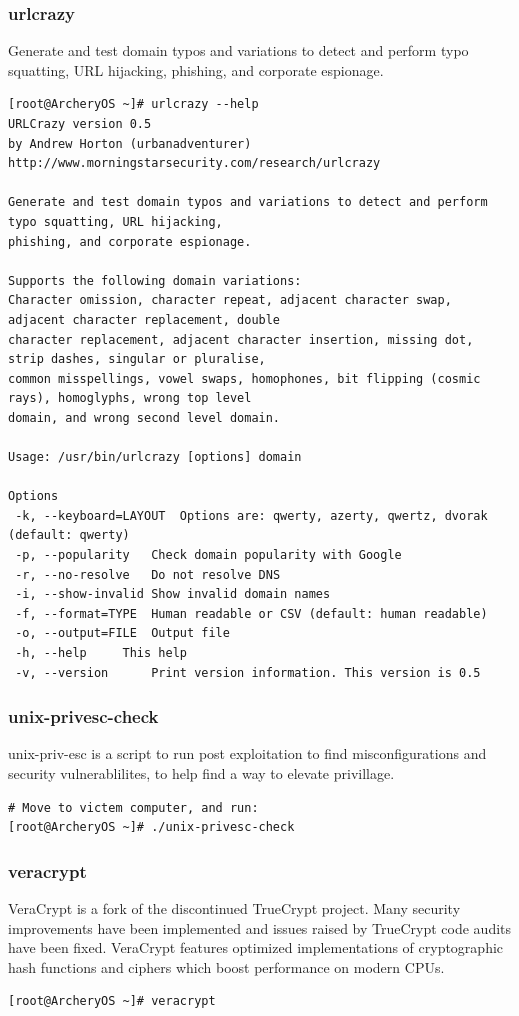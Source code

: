 \documentclass{article}
\begin{document}
\subsubsection{urlcrazy}
Generate and test domain typos and variations to detect and perform typo squatting, URL hijacking, phishing, and corporate espionage.
\begin{lstlisting}
[root@ArcheryOS ~]# urlcrazy --help
URLCrazy version 0.5
by Andrew Horton (urbanadventurer)
http://www.morningstarsecurity.com/research/urlcrazy

Generate and test domain typos and variations to detect and perform typo squatting, URL hijacking,
phishing, and corporate espionage.

Supports the following domain variations:
Character omission, character repeat, adjacent character swap, adjacent character replacement, double 
character replacement, adjacent character insertion, missing dot, strip dashes, singular or pluralise,
common misspellings, vowel swaps, homophones, bit flipping (cosmic rays), homoglyphs, wrong top level 
domain, and wrong second level domain.

Usage: /usr/bin/urlcrazy [options] domain

Options
 -k, --keyboard=LAYOUT	Options are: qwerty, azerty, qwertz, dvorak (default: qwerty)
 -p, --popularity	Check domain popularity with Google
 -r, --no-resolve	Do not resolve DNS
 -i, --show-invalid	Show invalid domain names
 -f, --format=TYPE	Human readable or CSV (default: human readable)
 -o, --output=FILE	Output file
 -h, --help		This help
 -v, --version   	Print version information. This version is 0.5
\end{lstlisting}

\subsubsection{unix-privesc-check}
unix-priv-esc is a script to run post exploitation to find misconfigurations and security vulnerablilites, to help find a way to elevate privillage.
\begin{lstlisting}
# Move to victem computer, and run:
[root@ArcheryOS ~]# ./unix-privesc-check
\end{lstlisting}

\subsubsection{veracrypt}
VeraCrypt is a fork of the discontinued TrueCrypt project. Many security improvements have been implemented and issues raised by TrueCrypt code audits have been fixed. VeraCrypt features optimized implementations of cryptographic hash functions and ciphers which boost performance on modern CPUs.
\begin{lstlisting}
[root@ArcheryOS ~]# veracrypt
\end{lstlisting}
\end{document}

